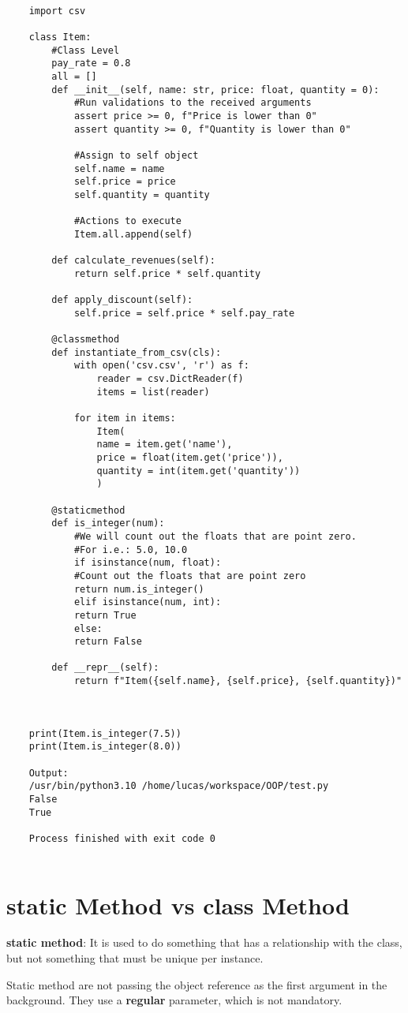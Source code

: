 \documentclass{article}
\begin{document}
\begin{lstlisting}
	
	import csv
	
	class Item:
		#Class Level
		pay_rate = 0.8
		all = []
		def __init__(self, name: str, price: float, quantity = 0):
			#Run validations to the received arguments
			assert price >= 0, f"Price is lower than 0"
			assert quantity >= 0, f"Quantity is lower than 0"
			
			#Assign to self object
			self.name = name
			self.price = price
			self.quantity = quantity
			
			#Actions to execute
			Item.all.append(self)
		
		def calculate_revenues(self):
			return self.price * self.quantity
			
		def apply_discount(self):
			self.price = self.price * self.pay_rate
			
		@classmethod
		def instantiate_from_csv(cls):
			with open('csv.csv', 'r') as f:
				reader = csv.DictReader(f)
				items = list(reader)
			
			for item in items:
				Item(
				name = item.get('name'),
				price = float(item.get('price')),
				quantity = int(item.get('quantity'))
				)

		@staticmethod
		def is_integer(num):
			#We will count out the floats that are point zero.
			#For i.e.: 5.0, 10.0
			if isinstance(num, float):
			#Count out the floats that are point zero
			return num.is_integer()
			elif isinstance(num, int):
			return True
			else:
			return False
			
		def __repr__(self):
			return f"Item({self.name}, {self.price}, {self.quantity})"
			
		
	
	print(Item.is_integer(7.5))
	print(Item.is_integer(8.0))
	
	Output:
	/usr/bin/python3.10 /home/lucas/workspace/OOP/test.py 
	False
	True
	
	Process finished with exit code 0
	
\end{lstlisting}

\section{static Method vs class Method}
\textbf{static method}: It is used to do something that has a relationship with the class, but not something that must be unique per instance.

Static method are not passing the object reference as the first argument in the background. They use a \textbf{regular} parameter, which is not mandatory.
\end{document}
